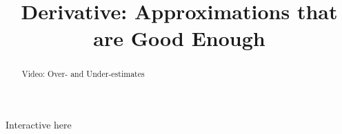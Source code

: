 \documentclass[handout]{ximera}
\title{Derivative: Approximations that are Good Enough}
\begin{document}
\begin{abstract} Video: Over- and Under-estimates %
\end{abstract}

\maketitle

Interactive here
\end{document}
